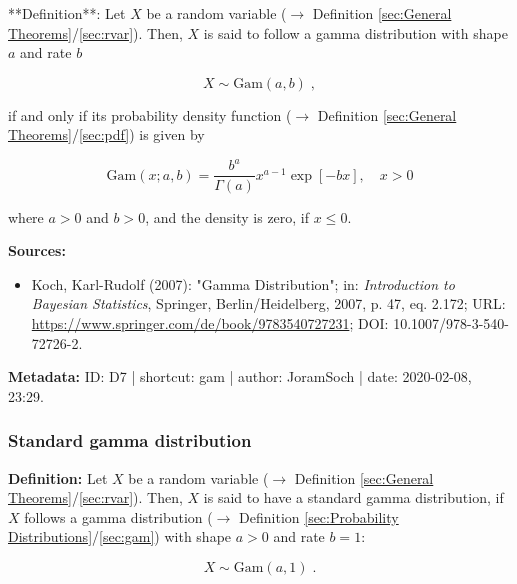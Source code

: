 \documentclass[a4paper,12pt,twoside]{book}
\begin{document}
**Definition**: Let $X$ be a random variable ($\rightarrow$ Definition \ref{sec:General Theorems}/\ref{sec:rvar}). Then, $X$ is said to follow a gamma distribution with shape $a$ and rate $b$

\begin{equation} \label{eq:gam-gam}
X \sim \mathrm{Gam}(a, b) \; ,
\end{equation}

if and only if its probability density function ($\rightarrow$ Definition \ref{sec:General Theorems}/\ref{sec:pdf}) is given by

\begin{equation} \label{eq:gam-gam-pdf}
\mathrm{Gam}(x; a, b) = \frac{b^a}{\Gamma(a)} x^{a-1} \exp[-b x], \quad x > 0
\end{equation}

where $a > 0$ and $b > 0$, and the density is zero, if $x \leq 0$.


\vspace{1em}
\textbf{Sources:}
\begin{itemize}
\item Koch, Karl-Rudolf (2007): "Gamma Distribution"; in: \textit{Introduction to Bayesian Statistics}, Springer, Berlin/Heidelberg, 2007, p. 47, eq. 2.172; URL: \url{https://www.springer.com/de/book/9783540727231}; DOI: 10.1007/978-3-540-72726-2.
\end{itemize}


\vspace{1em}
\textbf{Metadata:} ID: D7 | shortcut: gam | author: JoramSoch | date: 2020-02-08, 23:29.
\vspace{1em}



\subsubsection[\textit{Standard gamma distribution}]{Standard gamma distribution} \label{sec:sgam}
\setcounter{equation}{0}

\textbf{Definition:} Let $X$ be a random variable ($\rightarrow$ Definition \ref{sec:General Theorems}/\ref{sec:rvar}). Then, $X$ is said to have a standard gamma distribution, if $X$ follows a gamma distribution ($\rightarrow$ Definition \ref{sec:Probability Distributions}/\ref{sec:gam}) with shape $a > 0$ and rate $b = 1$:

\begin{equation} \label{eq:sgam-sgam}
X \sim \mathrm{Gam}(a, 1) \; .
\end{equation}
\end{document}
